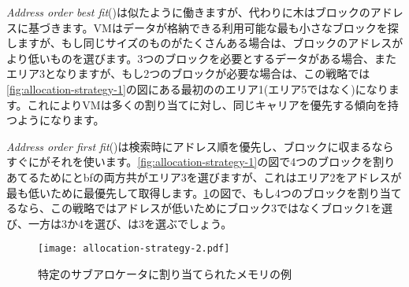 \emph{Address order best fit}()は似たように働きますが、代わりに木はブロックのアドレスに基づきます。VMはデータが格納できる利用可能な最も小さなブロックを探しますが、もし同じサイズのものがたくさんある場合は、ブロックのアドレスがより低いものを選びます。3つのブロックを必要とするデータがある場合、またエリア3となりますが、もし2つのブロックが必要な場合は、この戦略では\ref{fig:allocation-strategy-1}の図にある最初ののエリア1(エリア5ではなく)になります。これによりVMは多くの割り当てに対し、同じキャリアを優先する傾向を持つようになります。

\emph{Address order first fit}()は検索時にアドレス順を優先し、ブロックに収まるならすぐにがそれを使います。\ref{fig:allocation-strategy-1}の図で4つのブロックを割りあてるためにとbfの両方共がエリア3を選びますが、これはエリア2をアドレスが最も低いために最優先して取得します。\ref{fig:allocation-strategy-2}の図で、もし4つのブロックを割り当てるなら、この戦略ではアドレスが低いためにブロック3ではなくブロック1を選び、一方は3か4を選び、は3を選ぶでしょう。

\begin{figure}
  \texttt{[image: allocation-strategy-2.pdf]}%
  \centering%
  \caption{特定のサブアロケータに割り当てられたメモリの例}%
   \label{fig:allocation-strategy-2}
\end{figure}
\FloatBarrier

